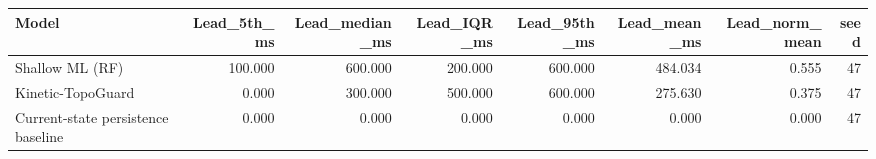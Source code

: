 \begin{tabular}{lrrrrrrr}
\toprule
Model & Lead\_5th\_ms & Lead\_median\_ms & Lead\_IQR\_ms & Lead\_95th\_ms & Lead\_mean\_ms & Lead\_norm\_mean & seed \\
\midrule
Shallow ML (RF) & 100.000 & 600.000 & 200.000 & 600.000 & 484.034 & 0.555 & 47 \\
Kinetic-TopoGuard & 0.000 & 300.000 & 500.000 & 600.000 & 275.630 & 0.375 & 47 \\
Current-state persistence baseline & 0.000 & 0.000 & 0.000 & 0.000 & 0.000 & 0.000 & 47 \\
\bottomrule
\end{tabular}